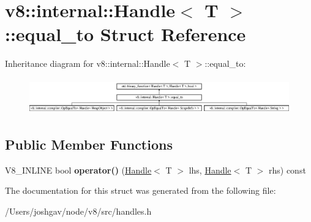 \hypertarget{structv8_1_1internal_1_1_handle_1_1equal__to}{}\section{v8\+:\+:internal\+:\+:Handle$<$ T $>$\+:\+:equal\+\_\+to Struct Reference}
\label{structv8_1_1internal_1_1_handle_1_1equal__to}
Inheritance diagram for v8\+:\+:internal\+:\+:Handle$<$ T $>$\+:\+:equal\+\_\+to\+:\begin{figure}[H]
\begin{center}
\leavevmode
\includegraphics[height=1.559889cm]{structv8_1_1internal_1_1_handle_1_1equal__to}
\end{center}
\end{figure}
\subsection*{Public Member Functions}
\begin{DoxyCompactItemize}
\item 
V8\+\_\+\+I\+N\+L\+I\+NE bool {\bfseries operator()} (\hyperlink{classv8_1_1internal_1_1_handle}{Handle}$<$ T $>$ lhs, \hyperlink{classv8_1_1internal_1_1_handle}{Handle}$<$ T $>$ rhs) const \hypertarget{structv8_1_1internal_1_1_handle_1_1equal__to_a460976bd6dc629b5b476c07f212dbb31}{}\label{structv8_1_1internal_1_1_handle_1_1equal__to_a460976bd6dc629b5b476c07f212dbb31}

\end{DoxyCompactItemize}


The documentation for this struct was generated from the following file\+:\begin{DoxyCompactItemize}
\item 
/\+Users/joshgav/node/v8/src/handles.\+h\end{DoxyCompactItemize}
